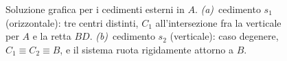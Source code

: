 \begin{figure}[ht]
{
			}
			\caption{Soluzione grafica per i cedimenti esterni in $A$.
				\emph{(a)}~cedimento $s_1$ (orizzontale): tre centri distinti,
				$C_1$ all'intersezione fra la verticale per $A$ e la retta $BD$.
				\emph{(b)}~cedimento $s_2$ (verticale): caso degenere,
				$C_1\equiv C_2\equiv B$, e il sistema ruota rigidamente
				attorno a $B$.}
			\label{fig:arco_cedimenti_esterni}
		\end{figure}
